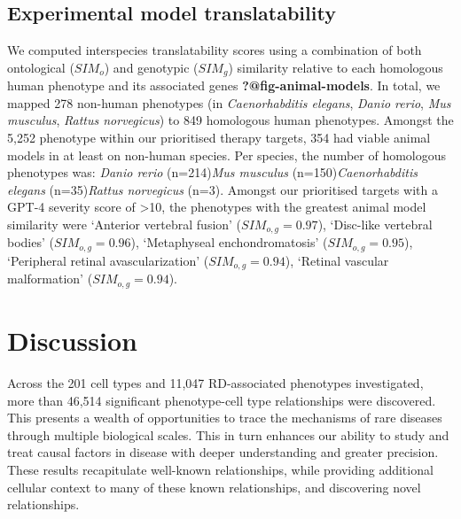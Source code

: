\documentclass[
]{report}
\begin{document}
\subsection{Experimental model
translatability}\label{experimental-model-translatability}

We computed interspecies translatability scores using a combination of
both ontological (\(SIM_{o}\)) and genotypic (\(SIM_{g}\)) similarity
relative to each homologous human phenotype and its associated genes
\textbf{?@fig-animal-models}. In total, we mapped 278 non-human
phenotypes (in \emph{Caenorhabditis elegans}, \emph{Danio rerio},
\emph{Mus musculus}, \emph{Rattus norvegicus}) to 849 homologous human
phenotypes. Amongst the 5,252 phenotype within our prioritised therapy
targets, 354 had viable animal models in at least on non-human species.
Per species, the number of homologous phenotypes was: \emph{Danio rerio}
(n=214)\emph{Mus musculus} (n=150)\emph{Caenorhabditis elegans}
(n=35)\emph{Rattus norvegicus} (n=3). Amongst our prioritised targets
with a GPT-4 severity score of \textgreater10, the phenotypes with the
greatest animal model similarity were `Anterior vertebral fusion'
(\(SIM_{o,g}=0.97\)), `Disc-like vertebral bodies' (\(SIM_{o,g}=0.96\)),
`Metaphyseal enchondromatosis' (\(SIM_{o,g}=0.95\)), `Peripheral retinal
avascularization' (\(SIM_{o,g}=0.94\)), `Retinal vascular malformation'
(\(SIM_{o,g}=0.94\)).

\section{Discussion}\label{sec-discussion}

Across the 201 cell types and 11,047 RD-associated phenotypes
investigated, more than 46,514 significant phenotype-cell type
relationships were discovered. This presents a wealth of opportunities
to trace the mechanisms of rare diseases through multiple biological
scales. This in turn enhances our ability to study and treat causal
factors in disease with deeper understanding and greater precision.
These results recapitulate well-known relationships, while providing
additional cellular context to many of these known relationships, and
discovering novel relationships.
\end{document}
